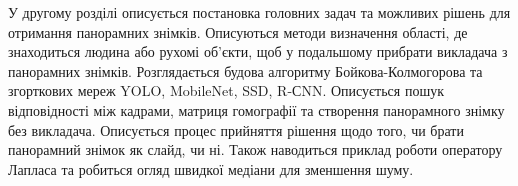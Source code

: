 У другому розділі описується постановка головних 
задач та можливих рішень для отримання панорамних знімків.
Описуються методи визначення області,
де знаходиться людина або рухомі об'єкти,
щоб у подальшому прибрати викладача з панорамних знімків.
Розглядається будова алгоритму Бойкова-Колмогорова та згорткових мереж 
YOLO, MobileNet, SSD, R-СNN. Описується пошук відповідності між кадрами,
матриця гомографії та створення панорамного
знімку без викладача.
Описується процес прийняття рішення щодо того,
чи брати панорамний знімок як слайд, чи ні. 
Також наводиться приклад роботи оператору Лапласа та робиться огляд швидкої медіани для
зменшення шуму.